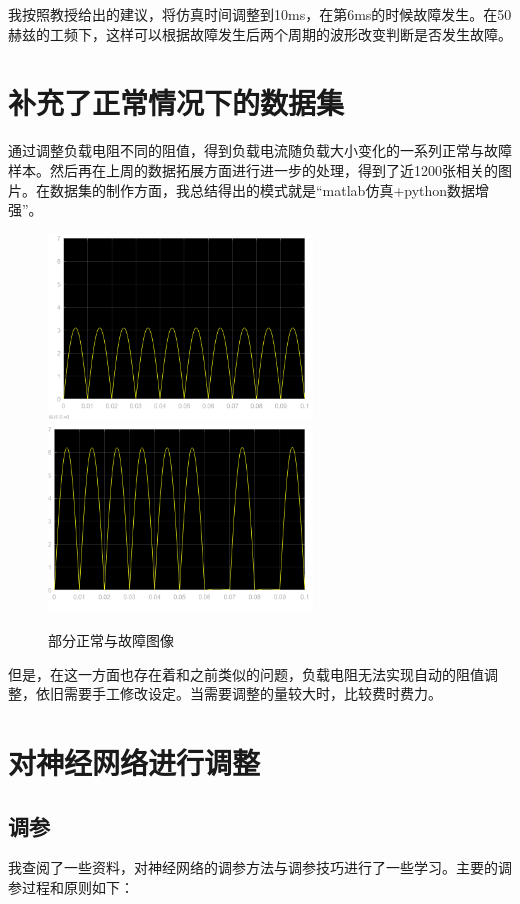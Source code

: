 \documentclass{article}
\begin{document}
	我按照教授给出的建议，将仿真时间调整到10ms，在第6ms的时候故障发生。在50赫兹的工频下，这样可以根据故障发生后两个周期的波形改变判断是否发生故障。
	
	\section{补充了正常情况下的数据集}
	
	通过调整负载电阻不同的阻值，得到负载电流随负载大小变化的一系列正常与故障样本。然后再在上周的数据拓展方面进行进一步的处理，得到了近1200张相关的图片。在数据集的制作方面，我总结得出的模式就是“matlab仿真+python数据增强”。
	
	\begin{figure}[htpb]
		\centering
		\includegraphics[width=7cm]{figure/normal_100ohms.png}
		\quad
		\includegraphics[width=7cm]{figure/D2_short_60ms_50ohms.png}
		\caption{部分正常与故障图像}
	\end{figure}

	但是，在这一方面也存在着和之前类似的问题，负载电阻无法实现自动的阻值调整，依旧需要手工修改设定。当需要调整的量较大时，比较费时费力。
	
	\section{对神经网络进行调整}
	
	\subsection{调参}
	我查阅了一些资料，对神经网络的调参方法与调参技巧进行了一些学习。主要的调参过程和原则如下：
	
\end{document}

